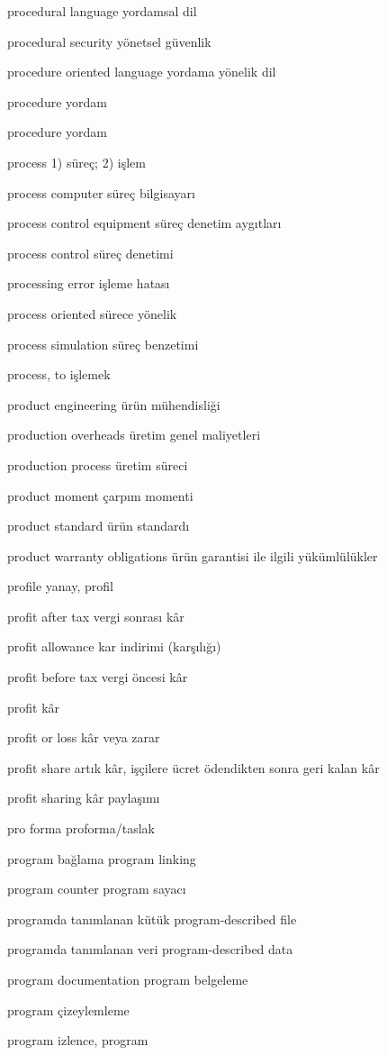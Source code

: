 \documentclass[12pt,fleqn]{article}\usepackage{../../common}
\begin{document}
procedural language yordamsal dil

procedural security yönetsel güvenlik

procedure oriented language yordama yönelik dil

procedure yordam

procedure yordam

process 1) süreç; 2) işlem

process computer süreç bilgisayarı

process control equipment süreç denetim aygıtları

process control süreç denetimi

processing error işleme hatası

process oriented sürece yönelik

process simulation süreç benzetimi

process, to işlemek

product engineering ürün mühendisliği

production overheads üretim genel maliyetleri

production process üretim süreci

product moment çarpım momenti

product standard ürün standardı

product warranty obligations ürün garantisi ile ilgili yükümlülükler

profile yanay, profil

profit after tax vergi sonrası kâr

profit allowance kar indirimi (karşılığı)

profit before tax vergi öncesi kâr

profit kâr

profit or loss kâr veya zarar

profit share artık kâr, işçilere ücret ödendikten sonra geri kalan kâr

profit sharing kâr paylaşımı

pro forma proforma/taslak

program bağlama program linking

program counter program sayacı

programda tanımlanan kütük program-described file

programda tanımlanan veri program-described data

program documentation program belgeleme

program çizeylemleme

program izlence, program
\end{document}
